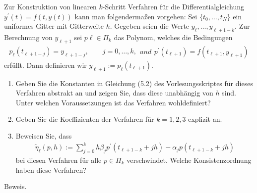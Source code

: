 \begin{exercise}
Zur Konstruktion von linearen $k$-Schritt Verfahren für die Differentialgleichung
$y^{\prime}(t) = f(t,y(t))$ kann man folgendermaßen vorgehen: Sei $\{t_0,\dots,t_N\}$
ein uniformes Gitter mit Gitterweite $h$. Gegeben seien die Werte $y_{\ell},\dots,y_{\ell + 1 - k}$.
Zur Berechnung von $y_{\ell + 1}$ sei $p{\ell} \in \Pi_k$ das Polynom, welches
die Bedingungen
\begin{subequations}
\begin{align}
  p_{\ell}(t_{\ell + 1- j}) = y_{\ell + 1 - j}, \qquad j = 0,\dots,k,
\end{align}
und
\begin{align}
  p^{\prime}(t_{\ell + 1}) = f(t_{\ell + 1},y_{\ell + 1})
\end{align}
\end{subequations}
erfüllt. Dann definieren wir $y_{\ell + 1} := p_{\ell}(t_{\ell + 1})$.
\begin{enumerate}[label = \textbf{\alph*)}]
  \item Geben Sie die Konstanten in Gleichung (5.2) des Vorlesungsskriptes für
  dieses Verfahren abstrakt an und zeigen Sie, dass diese unabhängig von $h$ sind.
  Unter welchen Voraussetzungen ist das Verfahren wohldefiniert?
  \item Geben Sie die Koeffizienten der Verfahren für $k = 1,2,3$ explizit an.
  \item Beweisen Sie, dass
  \begin{align}
    \tilde{\eta}_{\ell}(p,h) := \sum_{j= 0}^kh\beta_jp^{\prime}(t_{\ell + 1 -k} + jh)
    - \alpha_jp(t_{\ell + 1 - k} + jh)
  \end{align}
  bei diesen Verfahren für alle $p \in \Pi_k$ verschwindet. Welche Konsistenzordnung
  haben diese Verfahren?
\end{enumerate}
\end{exercise}
\begin{solution}
Beweis.
\end{solution}
